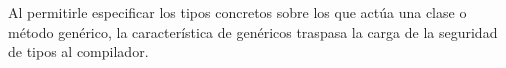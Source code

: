 Al permitirle especificar los tipos concretos sobre los que actúa una clase o método genérico, la característica de genéricos traspasa la carga de la seguridad de tipos al compilador.